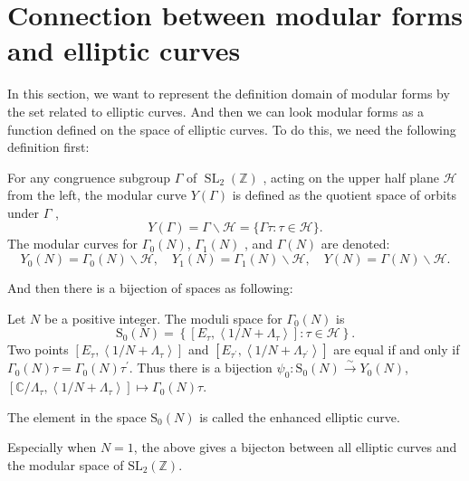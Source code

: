     \section{Connection between modular forms and elliptic curves}

    In this section, we want to represent the definition domain of modular forms by the set related to elliptic curves. And then we can look modular forms as a function defined on the space of elliptic curves.
    To do this, we need the following definition first:

    \begin{definition}
        For any congruence subgroup  $\Gamma$  of  $\operatorname{SL}_{2}(\mathbb{Z})$ , acting on the upper half plane  $\mathcal{H}$  from the left, the modular curve  $Y(\Gamma)$  is defined as the quotient space of orbits under  $\Gamma$ ,
        $$Y(\Gamma)=\Gamma \backslash \mathcal{H}=\{\Gamma \tau: \tau \in \mathcal{H}\}.$$
        The modular curves for  $\Gamma_{0}(N)$, $\Gamma_{1}(N)$ , and  $\Gamma(N)$  are denoted:
        $$Y_{0}(N)=\Gamma_{0}(N) \backslash \mathcal{H}, \quad Y_{1}(N)=\Gamma_{1}(N) \backslash \mathcal{H}, \quad Y(N)=\Gamma(N) \backslash \mathcal{H}.$$
    \end{definition}

    And then there is a bijection of spaces as following:

    \begin{theorem}
        Let  $N$  be a positive integer. The moduli space for  $\Gamma_{0}(N)$  is
        $$\mathrm{S}_{0}(N)=\left\{\left[E_{\tau},\left\langle 1 / N+\Lambda_{\tau}\right\rangle\right]: \tau \in \mathcal{H}\right\} .$$
        Two points  $\left[E_{\tau},\left\langle 1 / N+\Lambda_{\tau}\right\rangle\right]$  and $ \left[E_{\tau^{\prime}},\left\langle 1 / N+\Lambda_{\tau^{\prime}}\right\rangle\right]$  are equal if and only if $ \Gamma_{0}(N) \tau=\Gamma_{0}(N) \tau^{\prime}.$  Thus there is a bijection $\psi_{0}: \mathrm{S}_{0}(N) \stackrel{\sim}{\longrightarrow} Y_{0}(N)$, $\left[\mathbb{C} / \Lambda_{\tau},\left\langle 1 / N+\Lambda_{\tau}\right\rangle\right] \mapsto \Gamma_{0}(N) \tau $.
        
        
    \end{theorem}
        
    \begin{remark}
        The element in the space $\mathrm{S}_{0}(N)$ is called the enhanced elliptic curve.
        
        Especially when $N=1$, the above gives  a bijecton between all elliptic curves and the modular space of $\mathrm{SL}_2(\mathbb{Z})$.
    \end{remark}

